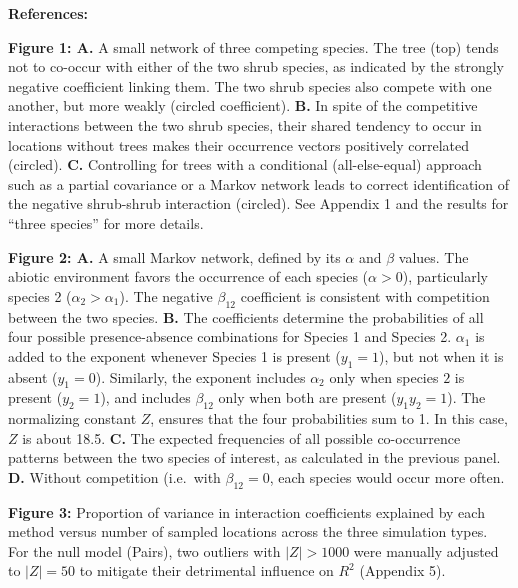 \documentclass[12pt,]{article}
\begin{document}
\begin{spacing}{1.9}
\begin{flushleft}
\setlength{\parindent}{0cm}

\noindent \textbf{References:}

\setlength{\parindent}{-1em} \setlength{\leftskip}{1em}
\setlength{\parskip}{0pt}

\textbf{Figure 1: A.} A small network of three competing species. The
tree (top) tends not to co-occur with either of the two shrub species,
as indicated by the strongly negative coefficient linking them. The two
shrub species also compete with one another, but more weakly (circled
coefficient). \textbf{B.} In spite of the competitive interactions
between the two shrub species, their shared tendency to occur in
locations without trees makes their occurrence vectors positively
correlated (circled). \textbf{C.} Controlling for trees with a
conditional (all-else-equal) approach such as a partial covariance or a
Markov network leads to correct identification of the negative
shrub-shrub interaction (circled). See Appendix 1 and the results for
``three species'' for more details.

\textbf{Figure 2: A.} A small Markov network, defined by its \(\alpha\)
and \(\beta\) values. The abiotic environment favors the occurrence of
each species (\(\alpha >0\)), particularly species 2
(\(\alpha_2 > \alpha_1\)). The negative \(\beta_{12}\) coefficient is
consistent with competition between the two species. \textbf{B.} The
coefficients determine the probabilities of all four possible
presence-absence combinations for Species 1 and Species 2. \(\alpha_1\)
is added to the exponent whenever Species 1 is present (\(y_1 = 1\)),
but not when it is absent (\(y_1 = 0\)). Similarly, the exponent
includes \(\alpha_2\) only when species \(2\) is present (\(y_2 = 1\)),
and includes \(\beta_{12}\) only when both are present (\(y_1y_2 = 1\)).
The normalizing constant \(Z\), ensures that the four probabilities sum
to 1. In this case, \(Z\) is about 18.5. \textbf{C.} The expected
frequencies of all possible co-occurrence patterns between the two
species of interest, as calculated in the previous panel. \textbf{D.}
Without competition (i.e.~with \(\beta_{12}=0\), each species would
occur more often.

\textbf{Figure 3:} Proportion of variance in interaction coefficients
explained by each method versus number of sampled locations across the
three simulation types. For the null model (Pairs), two outliers with
\(|Z|>1000\) were manually adjusted to \(|Z|=50\) to mitigate their
detrimental influence on \(R^2\) (Appendix 5).


\end{flushleft}
\end{spacing}
\end{document}
